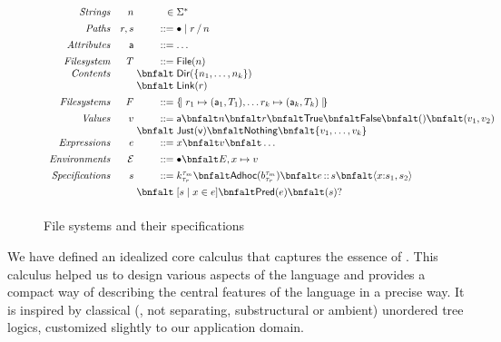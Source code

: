 \begin{figure}
\[
\begin{array}{rr@{\;}r@{\;}l}
\textit{Strings}        & n & \in & \Sigma^{\ast} \\[1ex]
\textit{Paths}          & r,s & \bnfdef & \PNil \mid \PCons{r}{n} \\[1ex]
\textit{Attributes}     & \att  & \bnfdef & \dots\\[1ex]
\textit{Filesystem}     & T  & \bnfdef & \File{n} \\
\textit{Contents}       &    & \bnfalt & \Dir{ \Set{n_1,\dots,n_k} }\\
                        &    & \bnfalt & \Link{r}\\[1ex]
\textit{Filesystems}    & F & \bnfdef & \Map{ r_1 \mapsto (\att_1,T_1), \dots r_k \mapsto (\att_k,T_k) }\\[1ex]
\textit{Values}         & v & \bnfdef & \att \bnfalt n \bnfalt r \bnfalt \True \bnfalt \False \bnfalt () \bnfalt (v_1,v_2) \\
                        &   & \bnfalt & \Just{v} \bnfalt \Nothing \bnfalt \{ v_1,\dots,v_k \}\\
\textit{Expressions}    & e & \bnfdef & x \bnfalt v \bnfalt \dots \\[1ex]
\textit{Environments}   & \Env & \bnfdef & \ENil \bnfalt E,x\mapsto v \\[1ex]
\textit{Specifications} & s & \bnfdef & \Sk 
                              \bnfalt \SAdhoc{b}
                              \bnfalt \SPath{e}{s}
                              \bnfalt \SPair{x}{s_1}{s_2}\\[1ex]
                        &   & \bnfalt & \SComp{s}{x}{e}
                              \bnfalt \SPred{e}
                              \bnfalt \SOption{s}\\[1ex]
\end{array}
\]
\caption{File systems and their specifications}
\label{fig:calculus-syntax}
\end{figure}

We have defined an idealized core calculus that captures the
essence of \forest{}.  This calculus helped us to design various
aspects of the language and provides a compact way of describing the
central features of the language in a precise way.  It is inspired by
classical (\ie{}, not separating, substructural or ambient)
unordered tree logics, customized slightly to our application domain.

